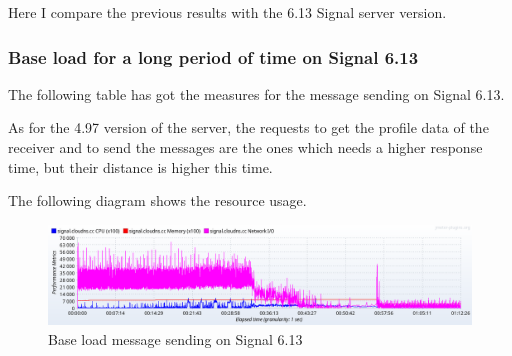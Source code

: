 Here I compare the previous results with the 6.13 Signal server version.

\subsubsection{Base load for a long period of time on Signal 6.13}

The following table has got the measures for the message sending on Signal 6.13.

\begin{table}[H]
\caption{Base load message sending on Signal 6.13}
\label{tab:baseloadmessagenew}
\end{table}

As for the 4.97 version of the server, the requests to get the profile data of the receiver and to send the messages are the ones which needs a higher response time, but their distance is higher this time.

The following diagram shows the resource usage.

\begin{figure}[H]
    \centering
    \includegraphics[width=\textwidth]{images/613/signal-base-message-load}
    \caption{Base load message sending on Signal 6.13}
    \label{fig:signalbasemessageloadnew}
\end{figure}

